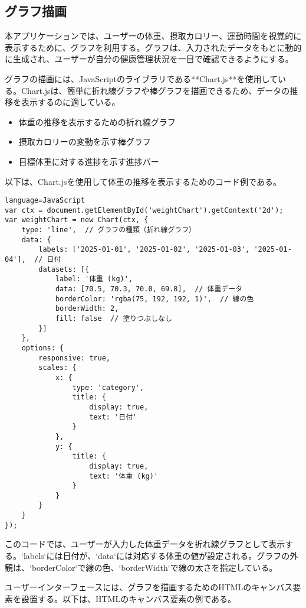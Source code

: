 \documentclass[uplatex,dvipdfmx]{jsarticle}
\begin{document}
\subsection{グラフ描画}

本アプリケーションでは、ユーザーの体重、摂取カロリー、運動時間を視覚的に表示するために、グラフを利用する。グラフは、入力されたデータをもとに動的に生成され、ユーザーが自分の健康管理状況を一目で確認できるようにする。

グラフの描画には、JavaScriptのライブラリである**Chart.js**を使用している。Chart.jsは、簡単に折れ線グラフや棒グラフを描画できるため、データの推移を表示するのに適している。

\begin{itemize}
    \item 体重の推移を表示するための折れ線グラフ
    \item 摂取カロリーの変動を示す棒グラフ
    \item 目標体重に対する進捗を示す進捗バー
\end{itemize}

以下は、Chart.jsを使用して体重の推移を表示するためのコード例である。

\begin{lstlisting}language=JavaScript
var ctx = document.getElementById('weightChart').getContext('2d');
var weightChart = new Chart(ctx, {
    type: 'line',  // グラフの種類（折れ線グラフ）
    data: {
        labels: ['2025-01-01', '2025-01-02', '2025-01-03', '2025-01-04'],  // 日付
        datasets: [{
            label: '体重 (kg)',
            data: [70.5, 70.3, 70.0, 69.8],  // 体重データ
            borderColor: 'rgba(75, 192, 192, 1)',  // 線の色
            borderWidth: 2,
            fill: false  // 塗りつぶしなし
        }]
    },
    options: {
        responsive: true,
        scales: {
            x: {
                type: 'category',
                title: {
                    display: true,
                    text: '日付'
                }
            },
            y: {
                title: {
                    display: true,
                    text: '体重 (kg)'
                }
            }
        }
    }
});
\end{lstlisting}

このコードでは、ユーザーが入力した体重データを折れ線グラフとして表示する。`labels`には日付が、`data`には対応する体重の値が設定される。グラフの外観は、`borderColor`で線の色、`borderWidth`で線の太さを指定している。

ユーザーインターフェースには、グラフを描画するためのHTMLのキャンバス要素を設置する。以下は、HTMLのキャンバス要素の例である。
\end{document}
